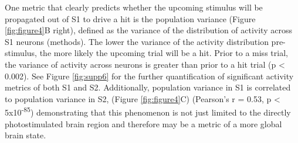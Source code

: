 One metric that clearly predicts whether the upcoming stimulus will be propagated out of S1 to drive a hit is the population variance  (Figure \ref{fig:figure4}B right), defined as the variance of the distribution of activity across S1 neurons (methods). The lower the variance of the activity distribution pre-stimulus, the more likely the upcoming trial will be a hit. Prior to a miss trial, the variance of activity across neurons is greater than prior to a hit trial (p < 0.002). See Figure \ref{fig:supp6} for the further quantification of significant activity metrics of both S1 and S2.  Additionally, population variance in S1 is correlated to population variance in S2, (Figure \ref{fig:figure4}C) (Pearson’s r = 0.53, p < 5x10\textsuperscript{-85}) demonstrating that this phenomenon is not just limited to the directly photostimulated brain region and therefore may be a metric of a more global brain state.


